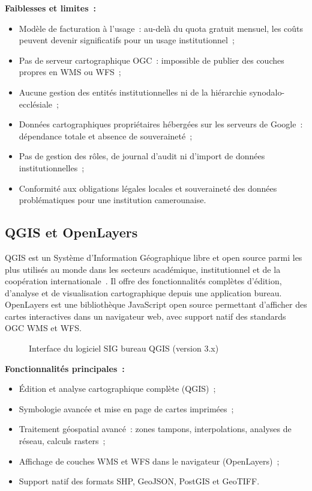 \documentclass[12pt, a4paper]{report}
\begin{document}
\noindent\textbf{Faiblesses et limites~:}
\begin{itemize}[itemsep=2pt, topsep=4pt, leftmargin=1.5cm]
  \item Modèle de facturation à l'usage~: au-delà du quota gratuit mensuel, les
    coûts peuvent devenir significatifs pour un usage institutionnel~;
  \item Pas de serveur cartographique OGC~: impossible de publier des couches
    propres en WMS ou WFS~;
  \item Aucune gestion des entités institutionnelles ni de la hiérarchie
    synodalo-ecclésiale~;
  \item Données cartographiques propriétaires hébergées sur les serveurs de
    Google~: dépendance totale et absence de souveraineté~;
  \item Pas de gestion des rôles, de journal d'audit ni d'import de données
    institutionnelles~;
  \item Conformité aux obligations légales locales et souveraineté des données
    problématiques pour une institution camerounaise.
\end{itemize}

\subsection{QGIS et OpenLayers}

QGIS est un Système d'Information Géographique libre et open source parmi les
plus utilisés au monde dans les secteurs académique, institutionnel et de la
coopération internationale~\cite{qgis2024}. Il offre des fonctionnalités
complètes d'édition, d'analyse et de visualisation cartographique depuis une
application bureau. OpenLayers est une bibliothèque JavaScript open source
permettant d'afficher des cartes interactives dans un navigateur web, avec support
natif des standards OGC WMS et WFS.

\begin{figure}[H]
  \centering
  \caption{Interface du logiciel SIG bureau QGIS (version 3.x)}
  \label{fig:qgis}
\end{figure}

\noindent\textbf{Fonctionnalités principales~:}
\begin{itemize}[itemsep=2pt, topsep=4pt, leftmargin=1.5cm]
  \item Édition et analyse cartographique complète (QGIS)~;
  \item Symbologie avancée et mise en page de cartes imprimées~;
  \item Traitement géospatial avancé~: zones tampons, interpolations, analyses de
    réseau, calculs rasters~;
  \item Affichage de couches WMS et WFS dans le navigateur (OpenLayers)~;
  \item Support natif des formats SHP, GeoJSON, PostGIS et GeoTIFF.
\end{itemize}
\end{document}
